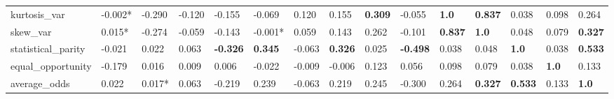 \begin{tabular}{lllllllllllllll}
kurtosis_var & -0.002* & -0.290 & -0.120 & -0.155 & -0.069 & 0.120 & 0.155 & \cellcolor{black!25}\textbf{0.309} & -0.055 & \cellcolor{black!25}\textbf{1.0} & \cellcolor{black!25}\textbf{0.837} & 0.038 & 0.098 & 0.264 \\
skew_var & 0.015* & -0.274 & -0.059 & -0.143 & -0.001* & 0.059 & 0.143 & 0.262 & -0.101 & \cellcolor{black!25}\textbf{0.837} & \cellcolor{black!25}\textbf{1.0} & 0.048 & 0.079 & \cellcolor{black!25}\textbf{0.327} \\
statistical_parity & -0.021 & 0.022 & 0.063 & \cellcolor{black!25}\textbf{-0.326} & \cellcolor{black!25}\textbf{0.345} & -0.063 & \cellcolor{black!25}\textbf{0.326} & 0.025 & \cellcolor{black!25}\textbf{-0.498} & 0.038 & 0.048 & \cellcolor{black!25}\textbf{1.0} & 0.038 & \cellcolor{black!25}\textbf{0.533} \\
equal_opportunity & -0.179 & 0.016 & 0.009 & 0.006 & -0.022 & -0.009 & -0.006 & 0.123 & 0.056 & 0.098 & 0.079 & 0.038 & \cellcolor{black!25}\textbf{1.0} & 0.133 \\
average_odds & 0.022 & 0.017* & 0.063 & -0.219 & 0.239 & -0.063 & 0.219 & 0.245 & -0.300 & 0.264 & \cellcolor{black!25}\textbf{0.327} & \cellcolor{black!25}\textbf{0.533} & 0.133 & \cellcolor{black!25}\textbf{1.0} \\
\bottomrule
\end{tabular}
